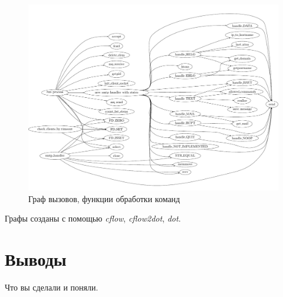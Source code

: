 \documentclass[a4paper,12pt]{report}
\begin{document}
\begin{figure}
\centering
\includegraphics[width=\textwidth]{include/scflow02_dot.pdf}
\caption{Граф вызовов, функции обработки команд}
\label{fig:scflow01}
\end{figure}

Графы созданы с помощью \textit{cflow}, \textit{cflow2dot}, \textit{dot}.

\chapter*{Выводы}

Что вы сделали и поняли.
\end{document}
